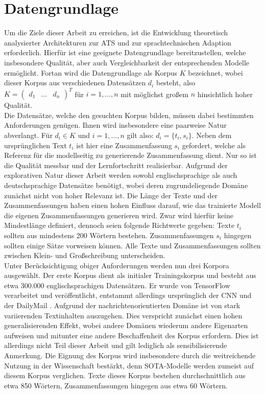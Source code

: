 \chapter{Datengrundlage}
\thispagestyle{fancy}
\label{chap:Datengrundlage}

\noindent
Um die Ziele dieser Arbeit zu erreichen, ist die Entwicklung theoretisch analysierter Architekturen zur \ac{ATS} und zur sprachtechnischen Adaption erforderlich. Hierfür ist eine geeignete Datengrundlage bereitzustellen, welche insbesondere Qualität, aber auch Vergleichbarkeit der entsprechenden Modelle ermöglicht. Fortan wird die Datengrundlage als Korpus $K$ bezeichnet, wobei dieser Korpus aus verschiedenen Datensätzen $d_i$ besteht, also $K=\begin{pmatrix} d_1 & \dots & d_n \end{pmatrix}^{T}$ für $i=1,...,n$ mit möglichst großem $n$ hinsichtlich hoher Qualität.\\

\noindent
Die Datensätze, welche den gesuchten Korpus bilden, müssen dabei bestimmten Anforderungen genügen. Ihnen wird insbesondere eine paarweise Natur abverlangt. Für $d_i \in K$ und $i=1,...,n$ gilt also: $d_i=\{t_i,s_i\}$. Neben dem ursprünglichen Text $t_i$ ist hier eine Zusammenfassung $s_i$ gefordert, welche als Referenz für die modellseitig zu generierende Zusammenfassung dient. Nur so ist die Qualität messbar und der Lernfortschritt realisierbar. Aufgrund der explorativen Natur dieser Arbeit werden sowohl englischsprachige als auch deutschsprachige Datensätze benötigt, wobei deren zugrundeliegende Domäne zunächst nicht von hoher Relevanz ist. Die Länge der Texte und der Zusammenfassungen haben einen hohen Einfluss darauf, wie das trainierte Modell die eigenen Zusammenfassungen generieren wird. Zwar wird hierfür keine Mindestlänge definiert, dennoch seien folgende Richtwerte gegeben: Texte $t_i$ sollten aus mindestens 200 Wörtern bestehen. Zusammenfassungen $s_i$ hingegen sollten einige Sätze vorweisen können. Alle Texte und Zusammenfassungen sollten zwischen Klein- und Großschreibung unterscheiden.\\

\noindent
Unter Berücksichtigung obiger Anforderungen werden nun drei Korpora ausgewählt. Der erste Korpus dient als initialer Trainingskorpus und besteht aus etwa 300.000 englischsprachigen Datensätzen. Er wurde von TensorFlow verarbeitet und veröffentlicht, entstammt allerdings ursprünglich der CNN und der DailyMail \cite{TEN21}. Aufgrund der nachrichtenorientierten Domäne ist von stark variierenden Textinhalten auszugehen. Dies verspricht zunächst einen hohen generalisierenden Effekt, wobei andere Domänen wiederum andere Eigenarten aufweisen und mitunter eine andere Beschaffenheit des Korpus erfordern. Dies ist allerdings nicht Teil dieser Arbeit und gilt lediglich als sensibilisierende Anmerkung. Die Eignung des Korpus wird insbesondere durch die weitreichende Nutzung in der Wissenschaft bestärkt, denn \ac{SOTA}-Modelle werden zumeist auf diesem Korpus verglichen. Texte dieses Korpus bestehen durchschnittlich aus etwa 850 Wörtern, Zusammenfassungen hingegen aus etwa 60 Wörtern.\\

